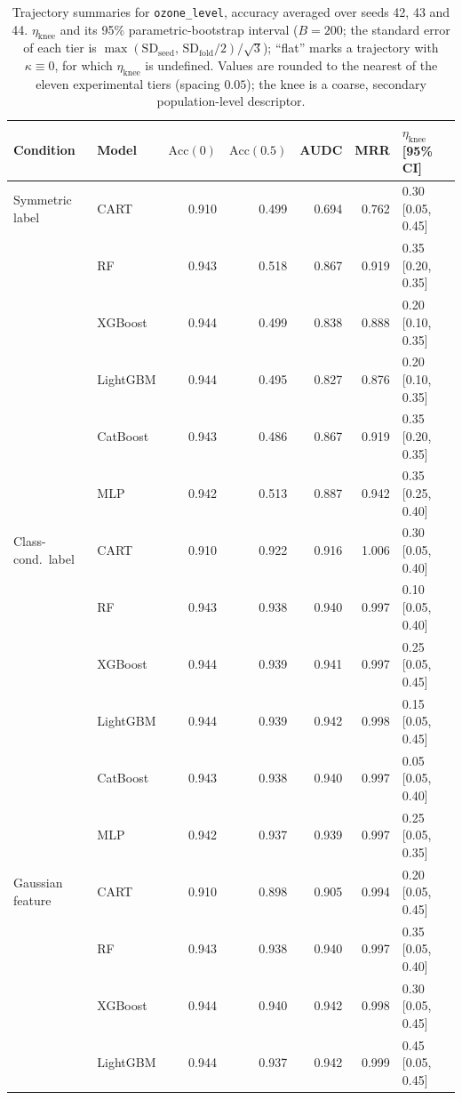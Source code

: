 \begin{table}[p]
\centering
\scriptsize
\setlength{\tabcolsep}{3.5pt}
\caption{Trajectory summaries for \texttt{ozone\_level}, accuracy averaged over seeds 42, 43 and 44. $\eta_{\mathrm{knee}}$ and its 95\% parametric-bootstrap interval ($B=200$; the standard error of each tier is $\max(\mathrm{SD}_{\mathrm{seed}},\,\mathrm{SD}_{\mathrm{fold}}/2)/\sqrt3$); ``flat'' marks a trajectory with $\kappa\equiv 0$, for which $\eta_{\mathrm{knee}}$ is undefined. Values are rounded to the nearest of the eleven experimental tiers (spacing $0.05$); the knee is a coarse, secondary population-level descriptor.}
\label{tab:traj_ozone_level}
\begin{tabular}{@{}llrrrrl@{}}
\toprule
Condition & Model & $\mathrm{Acc}(0)$ & $\mathrm{Acc}(0.5)$ & AUDC & MRR & $\eta_{\mathrm{knee}}$ [95\% CI] \\
\midrule
Symmetric label & CART & 0.910 & 0.499 & 0.694 & 0.762 & 0.30 [0.05, 0.45] \\
 & RF & 0.943 & 0.518 & 0.867 & 0.919 & 0.35 [0.20, 0.35] \\
 & XGBoost & 0.944 & 0.499 & 0.838 & 0.888 & 0.20 [0.10, 0.35] \\
 & LightGBM & 0.944 & 0.495 & 0.827 & 0.876 & 0.20 [0.10, 0.35] \\
 & CatBoost & 0.943 & 0.486 & 0.867 & 0.919 & 0.35 [0.20, 0.35] \\
 & MLP & 0.942 & 0.513 & 0.887 & 0.942 & 0.35 [0.25, 0.40] \\
\midrule
Class-cond.\ label & CART & 0.910 & 0.922 & 0.916 & 1.006 & 0.30 [0.05, 0.40] \\
 & RF & 0.943 & 0.938 & 0.940 & 0.997 & 0.10 [0.05, 0.40] \\
 & XGBoost & 0.944 & 0.939 & 0.941 & 0.997 & 0.25 [0.05, 0.45] \\
 & LightGBM & 0.944 & 0.939 & 0.942 & 0.998 & 0.15 [0.05, 0.45] \\
 & CatBoost & 0.943 & 0.938 & 0.940 & 0.997 & 0.05 [0.05, 0.40] \\
 & MLP & 0.942 & 0.937 & 0.939 & 0.997 & 0.25 [0.05, 0.35] \\
\midrule
Gaussian feature & CART & 0.910 & 0.898 & 0.905 & 0.994 & 0.20 [0.05, 0.45] \\
 & RF & 0.943 & 0.938 & 0.940 & 0.997 & 0.35 [0.05, 0.40] \\
 & XGBoost & 0.944 & 0.940 & 0.942 & 0.998 & 0.30 [0.05, 0.45] \\
 & LightGBM & 0.944 & 0.937 & 0.942 & 0.999 & 0.45 [0.05, 0.45] \\

\end{tabular}
\end{table}
